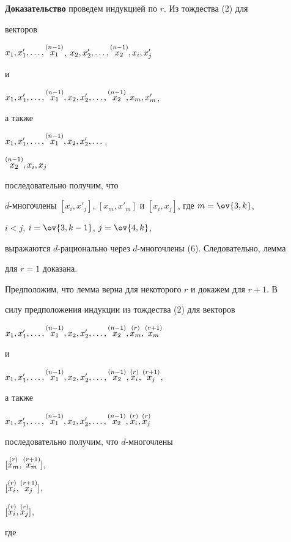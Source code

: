 {\bf Доказательство} проведем индукцией по $r$. Из тождества (2) для


векторов




$x_1,x'_1,\dotsc,\up{(n-1)}{x_1}$, $x_2,x'_2,\dotsc,


\up{(n-1)}{x_2},x_i, x'_j$


и


$x_1,x'_1,\dotsc,\up{(n-1)}{x_1},x_2,x'_2,\dotsc,


\up{(n-1)}{x_2},x_m, x'_m$,


а также


$x_1,x'_1,\dotsc,\overset{(n-1)}{x_1}{},x_2,x'_2,\dotsc$,




$\overset{(n-1)}{x_2}{},x_i, x_j$


последовательно получим, что


$d$-многочлены $[x_i,x'_j]$, $[x_m,x'_m]$ и $[x_i,x_j]$, где $m=\ov{3,k}$, 


$i<j$, $i=\ov{3,k-1}$, $j=\ov{4,k}$,


выражаются $d$-рационально через $d$-многочлены (6). Следовательно, лемма 


для $r=1$ доказана.





Предположим, что лемма верна для некоторого $r$ и докажем для $r+1$. В 


силу предположения индукции из тождества (2) для векторов


$x_1,x'_1,\dotsc,\up{(n-1)}{x_1},x_2,x'_2,\dotsc,


\up{(n-1)}{x_2},\up{(r)}{x_m},\up{(r+1)}{x_m}$


и


$x_1,x'_1,\dotsc,\up{(n-1)}{x_1},x_2,x'_2,\dotsc,


\up{(n-1)}{x_2},\up{(r)}{x_i},\up{(r+1)}{x_j}$,


а также


$x_1,x'_1,\dotsc,\up{(n-1)}{x_1},x_2,x'_2,\dotsc,


\up{(n-1)}{x_2},\up{(r)}{x_i},\up{(r)}{x_j}$


последовательно получим, что $d$-многочлены


$[\overset{(r)}{x_m}{},\overset{(r+1)}{x_m}{}]$,


$[\overset{(r)}{x_i}{},\overset{(r+1)}{x_j}{}]$,


$[\overset{(r)}{x_i}{},\overset{(r)}{x_j}{}]$,


где


